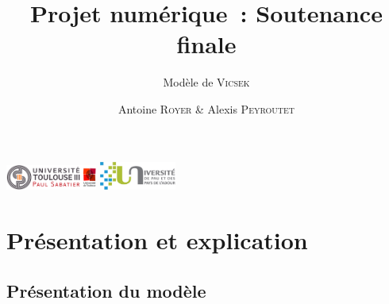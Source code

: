 \documentclass[aspectratio=43, a4paper, 12pt]{beamer}
\title{Projet numérique~: Soutenance finale}
\subtitle{Modèle de \textsc{Vicsek}}
\author{Antoine \textsc{Royer} \& Alexis \textsc{Peyroutet}}
\institute{L3 PCAME – Tarbes}
\date{}
\begin{document}
	\begin{frame}
		\titlepage
		\includegraphics[width=3cm]{images/ut3.png} \hfill \includegraphics[width=2.5cm]{images/uppa.png}
	\end{frame}
	
\section{Présentation et explication}
\subsection{Présentation du modèle}
\end{document}

